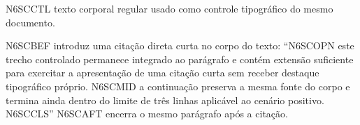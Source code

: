 \documentclass{abntexto-ufc}
\begin{document}
\textual

\noindent N6SCCTL texto corporal regular usado como controle tipográfico do mesmo documento.

\noindent N6SCBEF introduz uma citação direta curta no corpo do texto: \enquote{N6SCOPN este trecho controlado permanece integrado ao parágrafo e contém extensão suficiente para exercitar a apresentação de uma citação curta sem receber destaque tipográfico próprio. N6SCMID a continuação preserva a mesma fonte do corpo e termina ainda dentro do limite de três linhas aplicável ao cenário positivo. N6SCCLS} N6SCAFT encerra o mesmo parágrafo após a citação.
\end{document}
